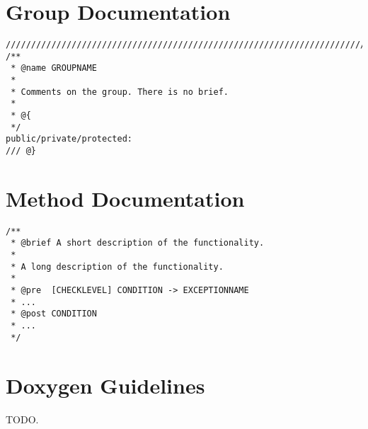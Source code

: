 \section{Group Documentation}
\label{sec:group-documentation}

\begin{verbatim}
///////////////////////////////////////////////////////////////////////////////
/**
 * @name GROUPNAME
 *
 * Comments on the group. There is no brief. 
 *
 * @{
 */
public/private/protected:
/// @}
\end{verbatim}


\section{Method Documentation}
\label{sec:method-documentation}

\begin{verbatim}
/**
 * @brief A short description of the functionality.
 *
 * A long description of the functionality.
 *
 * @pre  [CHECKLEVEL] CONDITION -> EXCEPTIONNAME
 * ...
 * @post CONDITION
 * ...
 */ 
\end{verbatim}


\section{Doxygen Guidelines}
\label{sec:doxygen-guidelines}

TODO.


